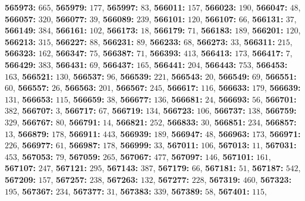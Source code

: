 \textsf{\bfseries 565973:} $665$, \textsf{\bfseries 565979:} $177$, \textsf{\bfseries 565997:} $83$, \textsf{\bfseries 566011:} $157$, \textsf{\bfseries 566023:} $190$, \textsf{\bfseries 566047:} $48$, \textsf{\bfseries 566057:} $320$, \textsf{\bfseries 566077:} $39$, \textsf{\bfseries 566089:} $239$, \textsf{\bfseries 566101:} $120$, \textsf{\bfseries 566107:} $66$, \textsf{\bfseries 566131:} $37$, \textsf{\bfseries 566149:} $384$, \textsf{\bfseries 566161:} $102$, \textsf{\bfseries 566173:} $18$, \textsf{\bfseries 566179:} $71$, \textsf{\bfseries 566183:} $189$, \textsf{\bfseries 566201:} $120$, \textsf{\bfseries 566213:} $315$, \textsf{\bfseries 566227:} $88$, \textsf{\bfseries 566231:} $89$, \textsf{\bfseries 566233:} $68$, \textsf{\bfseries 566273:} $33$, \textsf{\bfseries 566311:} $215$, \textsf{\bfseries 566323:} $162$, \textsf{\bfseries 566347:} $75$, \textsf{\bfseries 566387:} $71$, \textsf{\bfseries 566393:} $413$, \textsf{\bfseries 566413:} $173$, \textsf{\bfseries 566417:} $7$, \textsf{\bfseries 566429:} $383$, \textsf{\bfseries 566431:} $69$, \textsf{\bfseries 566437:} $165$, \textsf{\bfseries 566441:} $204$, \textsf{\bfseries 566443:} $753$, \textsf{\bfseries 566453:} $163$, \textsf{\bfseries 566521:} $130$, \textsf{\bfseries 566537:} $96$, \textsf{\bfseries 566539:} $221$, \textsf{\bfseries 566543:} $20$, \textsf{\bfseries 566549:} $69$, \textsf{\bfseries 566551:} $60$, \textsf{\bfseries 566557:} $26$, \textsf{\bfseries 566563:} $201$, \textsf{\bfseries 566567:} $245$, \textsf{\bfseries 566617:} $116$, \textsf{\bfseries 566633:} $179$, \textsf{\bfseries 566639:} $131$, \textsf{\bfseries 566653:} $115$, \textsf{\bfseries 566659:} $38$, \textsf{\bfseries 566677:} $136$, \textsf{\bfseries 566681:} $24$, \textsf{\bfseries 566693:} $56$, \textsf{\bfseries 566701:} $382$, \textsf{\bfseries 566707:} $3$, \textsf{\bfseries 566717:} $67$, \textsf{\bfseries 566719:} $134$, \textsf{\bfseries 566723:} $106$, \textsf{\bfseries 566737:} $138$, \textsf{\bfseries 566759:} $329$, \textsf{\bfseries 566767:} $80$, \textsf{\bfseries 566791:} $14$, \textsf{\bfseries 566821:} $252$, \textsf{\bfseries 566833:} $30$, \textsf{\bfseries 566851:} $234$, \textsf{\bfseries 566857:} $13$, \textsf{\bfseries 566879:} $178$, \textsf{\bfseries 566911:} $443$, \textsf{\bfseries 566939:} $189$, \textsf{\bfseries 566947:} $48$, \textsf{\bfseries 566963:} $173$, \textsf{\bfseries 566971:} $226$, \textsf{\bfseries 566977:} $61$, \textsf{\bfseries 566987:} $178$, \textsf{\bfseries 566999:} $33$, \textsf{\bfseries 567011:} $106$, \textsf{\bfseries 567013:} $11$, \textsf{\bfseries 567031:} $453$, \textsf{\bfseries 567053:} $79$, \textsf{\bfseries 567059:} $265$, \textsf{\bfseries 567067:} $477$, \textsf{\bfseries 567097:} $146$, \textsf{\bfseries 567101:} $161$, \textsf{\bfseries 567107:} $247$, \textsf{\bfseries 567121:} $295$, \textsf{\bfseries 567143:} $387$, \textsf{\bfseries 567179:} $66$, \textsf{\bfseries 567181:} $51$, \textsf{\bfseries 567187:} $542$, \textsf{\bfseries 567209:} $157$, \textsf{\bfseries 567257:} $238$, \textsf{\bfseries 567263:} $132$, \textsf{\bfseries 567277:} $228$, \textsf{\bfseries 567319:} $460$, \textsf{\bfseries 567323:} $195$, \textsf{\bfseries 567367:} $234$, \textsf{\bfseries 567377:} $31$, \textsf{\bfseries 567383:} $339$, \textsf{\bfseries 567389:} $58$, \textsf{\bfseries 567401:} $115$, 
